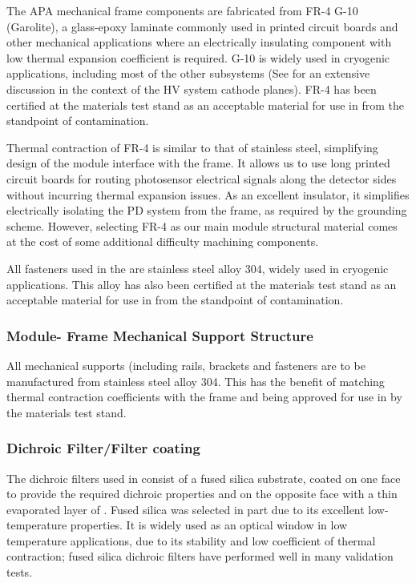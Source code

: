 The APA mechanical frame components are fabricated from FR-4 G-10 (Garolite\textregistered), a glass-epoxy laminate commonly used in printed circuit boards and other mechanical applications where an electrically insulating component with low thermal expansion coefficient is required.  G-10 is widely used in cryogenic applications, including most of the other  subsystems (See  for an extensive discussion in the context of the HV system cathode planes). 
FR-4 has been certified at the  materials test stand as an acceptable material for use in  from the standpoint of  contamination.

Thermal contraction of FR-4 is similar to that of stainless steel, simplifying design of the module interface with the  frame.
It allows us to use long printed circuit boards for routing photosensor electrical signals along the detector sides without incurring thermal expansion issues.  As an excellent insulator, it simplifies electrically isolating the PD system from the  frame, as required by the  grounding scheme.
However, selecting FR-4 as our main module structural material comes at the cost of some additional difficulty machining components.

All fasteners used in the  are stainless steel alloy 304, widely used in cryogenic applications.  This alloy has also been certified at the  materials test stand as an acceptable material for use in  from the standpoint of  contamination.

\subsubsection{ Module- Frame Mechanical Support Structure}

All  mechanical supports (including rails, brackets and fasteners are to be manufactured from stainless steel alloy 304.  This has the benefit of matching thermal contraction coefficients with the  frame and being approved for use in  by the materials test stand.

\subsubsection{Dichroic Filter/Filter coating}

The dichroic filters used in  consist of a fused silica substrate, coated on one face to provide the required dichroic properties and on the opposite face with a thin evaporated layer of .
Fused silica was selected in part due to its excellent low-temperature properties.  It is widely used as an optical window in low temperature applications, due to its stability and low coefficient of thermal contraction; fused silica dichroic filters have performed well in many  validation tests.

